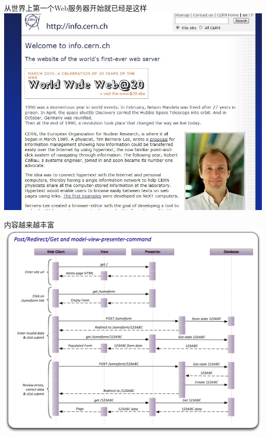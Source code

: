 \documentclass{beamer}
\begin{document}
\begin{frame}[plain]
	\begin{center}
	从世界上第一个Web服务器开始就已经是这样\\
	\includegraphics[width=\textwidth]{images/the-first-web-site-in-the-world.jpeg}
	\end{center}
\end{frame}

\begin{frame}[plain]
	\begin{center}
	内容越来越丰富\\
	\includegraphics[width=\textwidth]{images/Post-Redirect-Get-and-model-view-presenter-command2.png}
	\end{center}
\end{frame}
\end{document}
